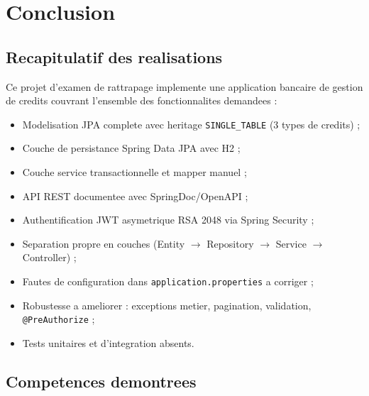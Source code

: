 \documentclass[12pt,a4paper]{report}
\newcommand{\OK}{\textcolor{green!60!black}{$\checkmark$}}
\newcommand{\WARN}{\textcolor{orange}{$\triangle$}}
\newcommand{\ERR}{\textcolor{red}{$\times$}}
\begin{document}
\chapter{Conclusion}

\section{Recapitulatif des realisations}

Ce projet d'examen de rattrapage implemente une application bancaire de gestion
de credits couvrant l'ensemble des fonctionnalites demandees :

\begin{itemize}
    \item[\OK] Modelisation JPA complete avec heritage \texttt{SINGLE\_TABLE}
               (3 types de credits) ;
    \item[\OK] Couche de persistance Spring Data JPA avec H2 ;
    \item[\OK] Couche service transactionnelle et mapper manuel ;
    \item[\OK] API REST documentee avec SpringDoc/OpenAPI ;
    \item[\OK] Authentification JWT asymetrique RSA 2048 via Spring Security ;
    \item[\OK] Separation propre en couches
               (Entity $\to$ Repository $\to$ Service $\to$ Controller) ;
    \item[\WARN] Fautes de configuration dans \texttt{application.properties}
                 a corriger ;
    \item[\WARN] Robustesse a ameliorer : exceptions metier, pagination,
                 validation, \texttt{@PreAuthorize} ;
    \item[\ERR] Tests unitaires et d'integration absents.
\end{itemize}

\section{Competences demontrees}
\end{document}
